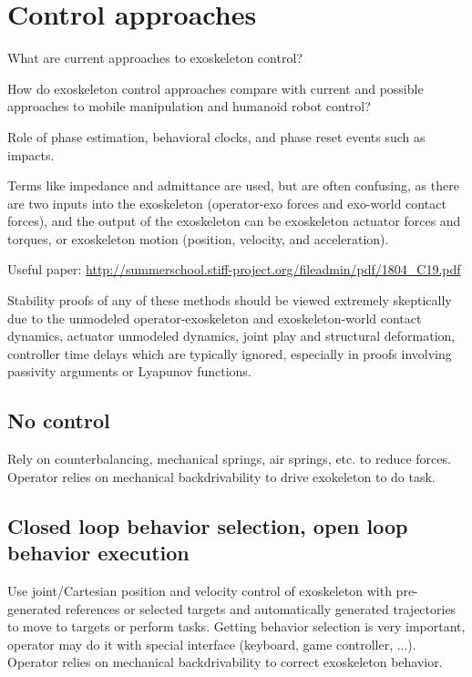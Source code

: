 \documentclass[letterpaper,12pt,fullpage]{article}
\begin{document}
\section{Control approaches}

What are current approaches to exoskeleton control?

How do exoskeleton control approaches compare with current and
possible approaches to mobile manipulation and humanoid robot control?

Role of phase estimation, behavioral clocks, and phase reset events
such as impacts.

Terms like impedance and admittance are used, but are often confusing,
as there are two inputs into the exoskeleton (operator-exo forces and
exo-world contact forces), and the output of the
exoskeleton can be exoskeleton actuator forces and torques, or exoskeleton
motion (position, velocity, and acceleration).

Useful paper: \url{http://summerschool.stiff-project.org/fileadmin/pdf/1804_C19.pdf}

Stability proofs of any of these methods should be viewed extremely skeptically due
to the unmodeled operator-exoskeleton and exoskeleton-world contact dynamics, 
actuator unmodeled dynamics, joint play and structural deformation, controller
time delays which are typically ignored, especially in proofs involving
passivity arguments or Lyapunov functions.

\subsection{No control}

Rely on counterbalancing, mechanical springs, air springs, etc.
to reduce forces. 
Operator relies on mechanical backdrivability to drive
exokeleton to do task.

\subsection{Closed loop behavior selection, open loop behavior
execution}

Use joint/Cartesian position and velocity control of exoskeleton 
with pre-generated references or selected targets and automatically generated trajectories to move to targets or perform tasks.
Getting behavior selection is very important, operator may do it with
special interface (keyboard, game controller, ...).
Operator relies on mechanical backdrivability to correct exoskeleton behavior.
\end{document}
